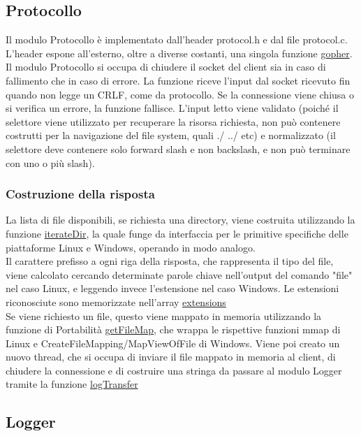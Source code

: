 \documentclass{article}
\begin{document}
\subsection{Protocollo}

Il modulo Protocollo è implementato dall'header protocol.h e dal file protocol.c.
L'header espone all'esterno, oltre a diverse costanti, una singola funzione \href{}{gopher}.
Il modulo Protocollo si occupa di chiudere il socket del client sia in caso di fallimento che in caso di errore.
La funzione riceve l'input dal socket ricevuto fin quando non legge un CRLF, come da protocollo.
Se la connessione viene chiusa o si verifica un errore, la funzione fallisce.
L'input letto viene validato (poiché il selettore viene utilizzato per recuperare la risorsa
richiesta, non può contenere costrutti per la navigazione del file system, quali ./ ../ etc) e normalizzato
(il selettore deve contenere solo forward slash e non backslash, e non può terminare con uno o più slash).

\subsubsection{Costruzione della risposta}
La lista di file disponibili, se richiesta una directory, viene costruita utilizzando la funzione \href{}
{iterateDir}, la quale funge da interfaccia per le primitive specifiche delle piattaforme Linux e Windows,
operando in modo analogo.\\
Il carattere prefisso a ogni riga della risposta, che rappresenta il tipo del file, viene calcolato
cercando determinate parole chiave nell'output del comando "file" nel caso Linux, e leggendo invece
l'estensione nel caso Windows. Le estensioni riconosciute sono memorizzate nell'array \href{}{extensions}\\
Se viene richiesto un file, questo viene mappato in memoria utilizzando la funzione di 
Portabilità \href{}{getFileMap}, che wrappa le rispettive funzioni
mmap di Linux e CreateFileMapping/MapViewOfFile di Windows. Viene poi creato un nuovo thread, che si occupa di
inviare il file mappato in memoria al client, di chiudere la connessione e di costruire una stringa da passare al
modulo Logger tramite la funzione \href{}{logTransfer}

\subsection{Logger}
\end{document}
